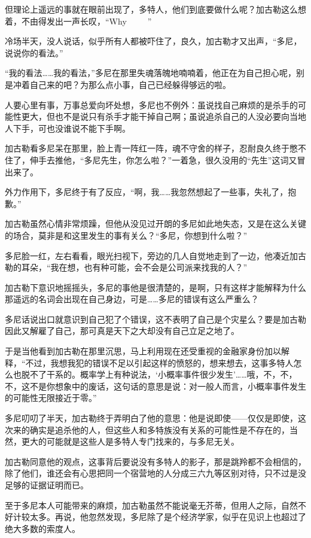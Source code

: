 但理论上遥远的事就在眼前出现了，多特人，他们到底要做什么呢？加古勒这么想着，不由得发出一声长叹，“Why~~~~~”

冷场半天，没人说话，似乎所有人都被吓住了，良久，加古勒才又出声，“多尼，说说你的看法。”

“我的看法……我的看法，”多尼在那里失魂落魄地喃喃着，他正在为自己担心呢，别是冲着自己来的吧？为那么点小事，自己已经躲得够远的啦。

人要心里有事，万事总爱向坏处想，多尼也不例外：虽说找自己麻烦的是杀手的可能性更大，但也不是说只有杀手才能干掉自己啊；虽说追杀自己的人没必要向当地人下手，可也没谁说不能下手啊。

加古勒看多尼呆在那里，脸上青一阵红一阵，魂不守舍的样子，忍耐良久终于憋不住了，伸手去推他，“多尼先生，你怎么啦？”一着急，很久没用的“先生”这词又冒出来了。

外力作用下，多尼终于有了反应，“啊，我……我忽然想起了一些事，失礼了，抱歉。”

加古勒虽然心情非常烦躁，但他从没见过开朗的多尼如此地失态，又是在这么关键的场合，莫非是和这里发生的事有关么？“多尼，你想到什么啦？”

多尼脸一红，左右看看，眼光扫视下，旁边的几人自觉地走到了一边，他凑近加古勒的耳朵，“我在想，也有种可能，会不会是公司派来找我的人？”

加古勒下意识地摇摇头，多尼的事他是很清楚的，是啊，只有这样才能解释为什么那遥远的名词会出现在自己身边，可是……多尼的错误有这么严重么？

多尼话说出口就意识到自己犯了个错误，这不表明了自己是个灾星么？要是加古勒因此又解雇了自己，那可真是天下之大却没有自己立足之地了。

于是当他看到加古勒在那里沉思，马上利用现在还受重视的金融家身份加以解释，“不过，我想我犯的错误不足以引起这样的愤怒的，想来想去，这事多特人怎么也脱不了干系的。概率学上有种说法，‘小概率事件很少发生’……哦，不，不，不，这不是你想象中的废话，这句话的意思是说：对一般人而言，小概率事件发生的可能性无限接近于零。”

多尼叨叨了半天，加古勒终于弄明白了他的意思：他是说即使——仅仅是即使，这次来的确实是追杀他的人，但这些人和多特族没有关系的可能性是不存在的，当然，更大的可能就是这些人是多特人专门找来的，与多尼无关。

加古勒同意他的观点，这事背后要说没有多特人的影子，那是跳羚都不会相信的，除了他们，谁还会有心思把同一个宿营地的人分成三六九等区别对待，只不过是没足够的证据证明而已。

至于多尼本人可能带来的麻烦，加古勒虽然不能说毫无芥蒂，但用人之际，自然不好计较太多。再说，他忽然发现，多尼除了是个经济学家，似乎在见识上也超过了绝大多数的索度人。

